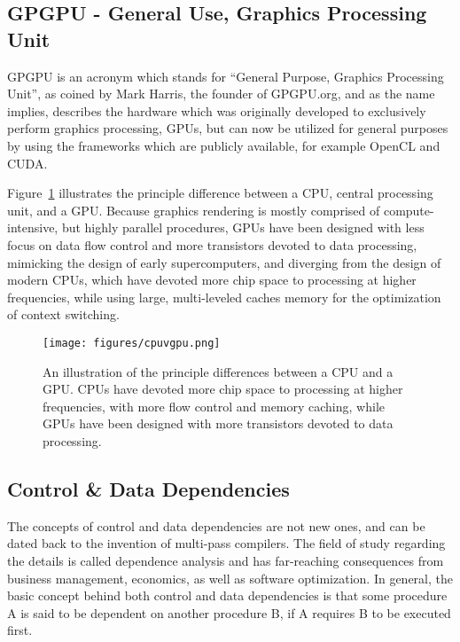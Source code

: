 %
%
%
%
\subsection{GPGPU - General Use, Graphics Processing Unit}
\label{ch2sPPssGPGPU}
GPGPU is an acronym which stands for ``General Purpose, Graphics Processing Unit'', as coined by Mark Harris, the founder of GPGPU.org, and as the name implies, describes the hardware which was originally developed to exclusively perform graphics processing, GPUs, but can now be utilized for general purposes by using the frameworks which are publicly available, for example OpenCL and CUDA.

Figure~\ref{fig:cpuvgpu} illustrates the principle difference between a CPU, central processing unit, and a GPU. Because graphics rendering is mostly comprised of compute-intensive, but highly parallel procedures, GPUs have been designed with less focus on data flow control and more transistors devoted to data processing, mimicking the design of early supercomputers, and diverging from the design of modern CPUs, which have devoted more chip space to processing at higher frequencies, while using large, multi-leveled caches memory for the optimization of context switching.

\begin{figure}[ht]
\ffigbox
	{\texttt{[image: figures/cpuvgpu.png]}}%
	{\caption[CPU vs GPU Construction]{An illustration of the principle differences between a CPU and a GPU. CPUs have devoted more chip space to processing at higher frequencies, with more flow control and memory caching, while GPUs have been designed with more transistors devoted to data processing.}\label{fig:cpuvgpu}}
\end{figure}

%
%
%
%
\subsection{Control \& Data Dependencies}
\label{ch2sPPssCDD}

The concepts of control and data dependencies are not new ones, and can be dated back to the invention of multi-pass compilers. The field of study regarding the details is called dependence analysis and has far-reaching consequences from business management, economics, as well as software optimization. In general, the basic concept behind both control and data dependencies is that some procedure A is said to be dependent on another procedure B, if A requires B to be executed first.

